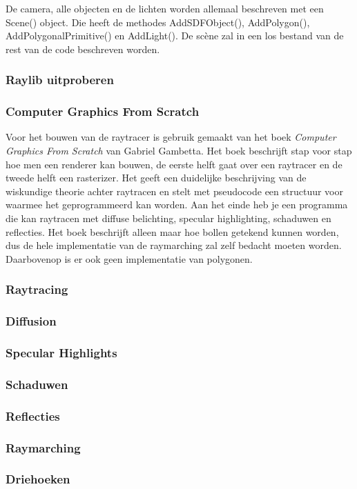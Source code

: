 \documentclass[12pt, a4paper]{article}
\begin{document}
De camera, alle objecten en de lichten worden allemaal beschreven met een Scene() object. Die heeft de methodes AddSDFObject(), AddPolygon(), AddPolygonalPrimitive() en AddLight(). De scène zal in een los bestand van de rest van de code beschreven worden.
\subsubsection{Raylib uitproberen}
\subsubsection{Computer Graphics From Scratch}
Voor het bouwen van de raytracer is gebruik gemaakt van het boek \emph{Computer Graphics From Scratch} \cite{ComputerGraphicsFromScratch} van Gabriel Gambetta. Het boek beschrijft stap voor stap hoe men een renderer kan bouwen, de eerste helft gaat over een raytracer en de tweede helft een rasterizer. Het geeft een duidelijke beschrijving van de wiskundige theorie achter raytracen en stelt met pseudocode een structuur voor waarmee het geprogrammeerd kan worden. Aan het einde heb je een programma die kan raytracen met diffuse belichting, specular highlighting, schaduwen en reflecties. Het boek beschrijft alleen maar hoe bollen getekend kunnen worden, dus de hele implementatie van de raymarching zal zelf bedacht moeten worden. Daarbovenop is er ook geen implementatie van polygonen. 
\subsubsection{Raytracing}
\subsubsection{Diffusion}
\subsubsection{Specular Highlights}
\subsubsection{Schaduwen}
\subsubsection{Reflecties}
\subsubsection{Raymarching}
\subsubsection{Driehoeken}
\end{document}
